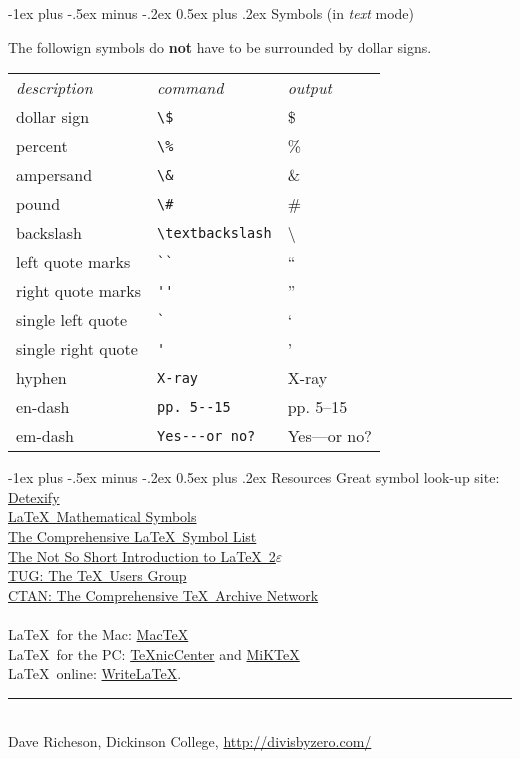\documentclass[10pt,landscape]{article}
\makeatletter
\renewcommand{\section}{\@startsection{section}{1}{0mm}%
	{-1ex plus -.5ex minus -.2ex}%
	{0.5ex plus .2ex}%
	{\normalfont\large\bfseries}}
\makeatother
\begin{document}
\begin{multicols}{3}
		\section{Symbols (in \emph{text} mode)}
		
		The followign symbols do \textbf{not} have to be surrounded by dollar signs.
		
		\begin{tabular}{lll}
			\emph{description} & \emph{command} & \emph{output}\\
			dollar sign & \verb!\$! & \$ \\
			percent & \verb!\%! & \% \\
			ampersand & \verb!\&! & \& \\
			pound & \verb!\#! & \# \\
			backslash & \verb!\textbackslash! & \textbackslash \\
			left quote marks & \verb!``! & `` \\
			right quote marks & \verb!''! & '' \\
			single left quote  & \verb!`! & ` \\
			single right quote  & \verb!'! & ' \\
			hyphen & \verb!X-ray! & X-ray\\
			en-dash & \verb!pp. 5--15! & pp. 5--15 \\
			em-dash & \verb!Yes---or no?! & Yes---or no? 
		\end{tabular}
		
		\section{Resources}
		Great symbol look-up site: \href{http://detexify.kirelabs.org/}{Detexify}\\
		\href{http://amath.colorado.edu/documentation/LaTeX/Symbols.pdf}{\LaTeX\ Mathematical Symbols}\\
		\href{ftp://tug.ctan.org/pub/tex-archive/info/symbols/comprehensive/symbols-letter.pdf}{The Comprehensive \LaTeX\ Symbol List}\\ 
		\href{http://mirrors.med.harvard.edu/ctan/info/lshort/english/lshort.pdf}{The Not So Short Introduction to \LaTeX\ 2$\varepsilon$}\\
		\href{http://www.tug.org/}{TUG: The \TeX\ Users Group}\\
		\href{http://www.ctan.org/}{CTAN: The Comprehensive \TeX\ Archive Network}\\
		~\\
		\LaTeX\ for the Mac: \href{http://www.tug.org/mactex/}{Mac\TeX}\\
		\LaTeX\ for the PC: \href{http://www.texniccenter.org/}{{\TeX}nicCenter} and \href{http://miktex.org/}{MiK\TeX}\\
		\LaTeX\ online: \href{http://www.writelatex.com/}{WriteLaTeX}.
		\vfill
		\hrule
		~\\
		Dave Richeson, Dickinson College, \href{http://divisbyzero.com/}{http://divisbyzero.com/}
	\end{multicols}
	
\end{document}
